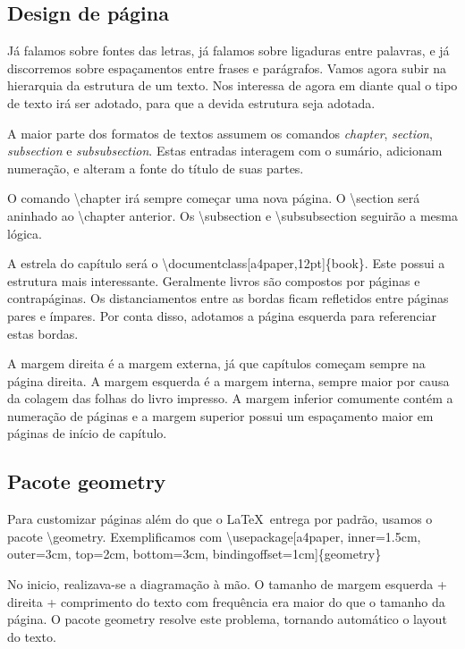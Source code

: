 \begin{landscape}
\chapter{Design de página}
Já falamos sobre fontes das letras, já falamos sobre ligaduras entre palavras, e já discorremos sobre espaçamentos entre frases e parágrafos.
Vamos agora subir na hierarquia da estrutura de um texto.
Nos interessa de agora em diante qual o tipo de texto irá ser adotado, para que a devida estrutura seja adotada.

A maior parte dos formatos de textos assumem os comandos \emph{chapter}, \emph{section}, \emph{subsection} e \emph{subsubsection}.
Estas entradas interagem com o sumário, adicionam numeração, e alteram a fonte do título de suas partes.

O comando \textbackslash chapter irá sempre começar uma nova página.
O \textbackslash section será aninhado ao \textbackslash chapter anterior.
Os \textbackslash subsection e \textbackslash subsubsection seguirão a mesma lógica.

A estrela do capítulo será o \textbackslash documentclass[a4paper,12pt]\{book\}.
Este possui a estrutura mais interessante.
Geralmente livros são compostos por páginas e contrapáginas.
Os distanciamentos entre as bordas ficam refletidos entre páginas pares e ímpares.
Por conta disso, adotamos a página esquerda para referenciar estas bordas.

A margem direita é a margem externa, já que capítulos começam sempre na página direita.
A margem esquerda é a margem interna, sempre maior por causa da colagem das folhas do livro impresso.
A margem inferior comumente contém a numeração de páginas e a margem superior possui um espaçamento maior em páginas de início de capítulo.

\end{landscape}

\section{Pacote geometry}
Para customizar páginas além do que o \LaTeX\ entrega por padrão, usamos o pacote \textbackslash geometry. 
Exemplificamos com 
\textbackslash usepackage[a4paper, inner=1.5cm, outer=3cm, top=2cm, bottom=3cm, bindingoffset=1cm]\{geometry\}

No inicio, realizava-se a diagramação à mão.
O tamanho de margem esquerda + direita + comprimento do texto com frequência era maior do que o tamanho da página.
O pacote geometry resolve este problema, tornando automático o layout do texto.

